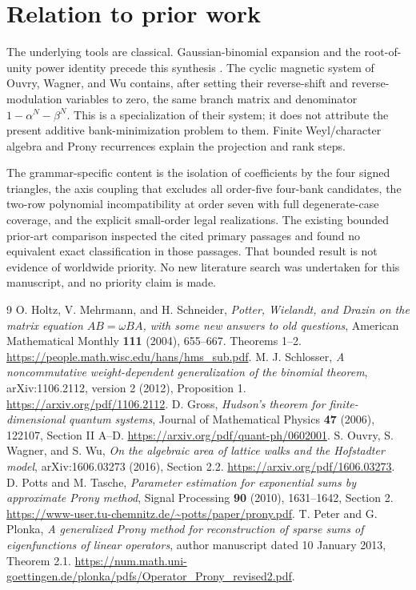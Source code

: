 \documentclass[11pt,letterpaper]{article}
\theoremstyle{definition}\newtheorem{definition}[theorem]{Definition}
\begin{document}
\section{Relation to prior work}

The underlying tools are classical. Gaussian-binomial expansion and the root-of-unity power identity precede this synthesis \cite{HMS,Schlosser}. The cyclic magnetic system of Ouvry, Wagner, and Wu \cite[Section 2.2, equations 7--8]{Ouvry} contains, after setting their reverse-shift and reverse-modulation variables to zero, the same branch matrix and denominator $1-\alpha^N-\beta^N$. This is a specialization of their system; it does not attribute the present additive bank-minimization problem to them. Finite Weyl/character algebra \cite{Gross} and Prony recurrences \cite{PottsTasche,PeterPlonka} explain the projection and rank steps.

The grammar-specific content is the isolation of coefficients by the four signed triangles, the axis coupling that excludes all order-five four-bank candidates, the two-row polynomial incompatibility at order seven with full degenerate-case coverage, and the explicit small-order legal realizations. The existing bounded prior-art comparison inspected the cited primary passages and found no equivalent exact classification in those passages. That bounded result is not evidence of worldwide priority. No new literature search was undertaken for this manuscript, and no priority claim is made.



\begin{thebibliography}{9}
 O. Holtz, V. Mehrmann, and H. Schneider,
\emph{Potter, Wielandt, and Drazin on the matrix equation $AB=\omega BA$, with some new answers to old questions},
American Mathematical Monthly \textbf{111} (2004), 655--667. Theorems 1--2.
\url{https://people.math.wisc.edu/hans/hms_sub.pdf}.
 M. J. Schlosser,
\emph{A noncommutative weight-dependent generalization of the binomial theorem},
arXiv:1106.2112, version 2 (2012), Proposition 1.
\url{https://arxiv.org/pdf/1106.2112}.
 D. Gross,
\emph{Hudson's theorem for finite-dimensional quantum systems},
Journal of Mathematical Physics \textbf{47} (2006), 122107, Section II A--D.
\url{https://arxiv.org/pdf/quant-ph/0602001}.
 S. Ouvry, S. Wagner, and S. Wu,
\emph{On the algebraic area of lattice walks and the Hofstadter model},
arXiv:1606.03273 (2016), Section 2.2.
\url{https://arxiv.org/pdf/1606.03273}.
 D. Potts and M. Tasche,
\emph{Parameter estimation for exponential sums by approximate Prony method},
Signal Processing \textbf{90} (2010), 1631--1642, Section 2.
\url{https://www-user.tu-chemnitz.de/~potts/paper/prony.pdf}.
 T. Peter and G. Plonka,
\emph{A generalized Prony method for reconstruction of sparse sums of eigenfunctions of linear operators},
author manuscript dated 10 January 2013, Theorem 2.1.
\url{https://num.math.uni-goettingen.de/plonka/pdfs/Operator_Prony_revised2.pdf}.
\end{thebibliography}
\end{document}
